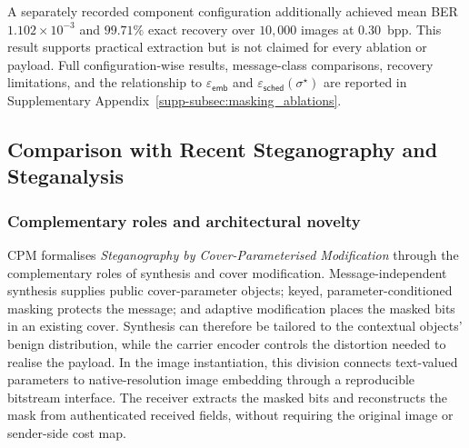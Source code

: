 \documentclass[pdflatex,sn-mathphys-num]{sn-jnl}%
\theoremstyle{definition}
\theoremstyle{game}
\theoremstyle{thmstyleone}%
\theoremstyle{thmstyletwo}%
\theoremstyle{thmstylethree}%
\begin{document}
A separately recorded component configuration additionally achieved mean BER
$1.102\times10^{-3}$ and $99.71\%$ exact recovery over $10{,}000$ images at
$0.30$~bpp. This result supports practical extraction but is not claimed for
every ablation or payload. Full configuration-wise results, message-class
comparisons, recovery limitations, and the relationship to
$\varepsilon_{\mathsf{emb}}$ and
$\varepsilon_{\mathsf{sched}}(\sigma^\star)$ are reported in
Supplementary Appendix~\ref{supp-subsec:masking_ablations}.











\subsection{Comparison with Recent Steganography and Steganalysis}
\label{subsec:recent-comparison}

\subsubsection{Complementary roles and architectural novelty}
CPM formalises \emph{Steganography by Cover-Parameterised Modification}
through the complementary roles of synthesis and cover modification.
Message-independent synthesis supplies public cover-parameter objects;
keyed, parameter-conditioned masking protects the message; and adaptive
modification places the masked bits in an existing cover. Synthesis can
therefore be tailored to the contextual objects' benign distribution,
while the carrier encoder controls the distortion needed to realise the
payload. In the image instantiation, this division connects text-valued
parameters to native-resolution image embedding through a reproducible
bitstream interface. The receiver extracts the masked bits and reconstructs
the mask from authenticated received fields, without requiring the original
image or sender-side cost map.
\end{document}
